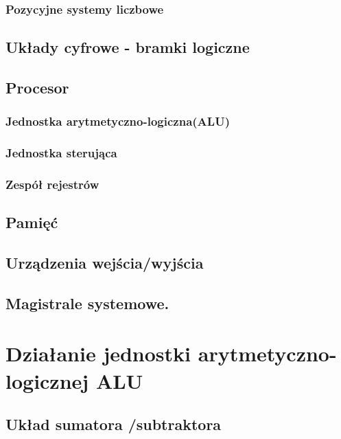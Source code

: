 \documentclass[12pt, a4paper, onside, polish]{article}				%
\begin{document}
\subsubsection{Pozycyjne systemy liczbowe}
\cleardoublepage

\subsection{Układy cyfrowe - bramki logiczne}
\cleardoublepage

\subsection{Procesor}
\cleardoublepage

\subsubsection{Jednostka arytmetyczno-logiczna(ALU)}
\cleardoublepage

\subsubsection{Jednostka sterująca}
\cleardoublepage

\subsubsection{Zespół rejestrów}
\cleardoublepage

\subsection{Pamięć}
\cleardoublepage

\subsection{Urządzenia wejścia/wyjścia}
\cleardoublepage

\subsection{Magistrale systemowe.}
\cleardoublepage





\section{Działanie jednostki arytmetyczno-logicznej ALU}
\subsection{Układ sumatora /subtraktora}
\cleardoublepage
\end{document}
